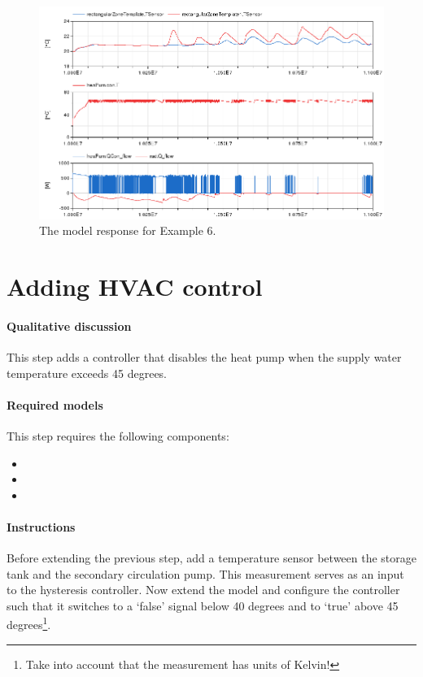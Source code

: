 \documentclass[10pt,a4paper]{article}
\begin{document}
\begin{figure}
\centering
\includegraphics[width=\linewidth]{Example6.png}
\caption{The model response for Example 6.}
\label{fig:res1}
\end{figure}


\section{Adding HVAC control}
\paragraph{Qualitative discussion}
This step adds a controller that disables the heat pump
when the supply water temperature exceeds 45 degrees.


\paragraph{Required models}
This step requires the following components:
\begin{itemize}
\item {}
\item {}
\item {}
\end{itemize}

\paragraph{Instructions}
Before extending the previous step, add a temperature sensor between the storage tank
and the secondary circulation pump.
This measurement serves as an input to the hysteresis controller.
Now extend the model and configure the controller such that it switches to a `false' signal below
40 degrees and to `true' above 45 degrees\footnote{Take into account that the measurement has units of Kelvin!}.
\end{document}
